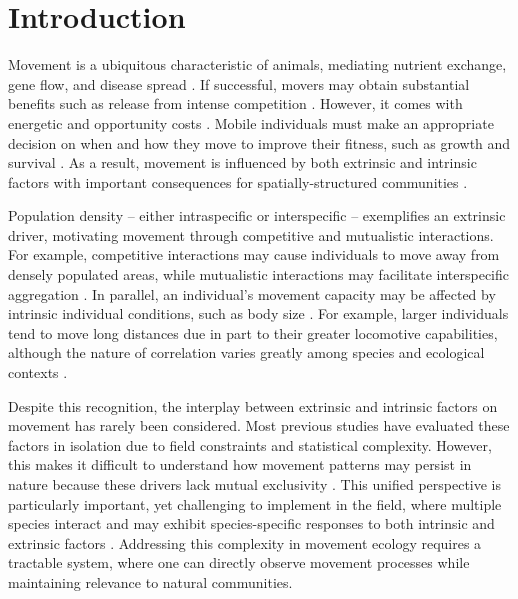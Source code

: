 \documentclass[11pt, class=article, crop=false]{standalone}
\begin{document}
\newpage

\section{Introduction}

Movement is a ubiquitous characteristic of animals, mediating nutrient exchange, gene flow, and disease spread \citep{cookeMovementEcologyFishes2022, hessDiseaseMetapopulationModels1996, teruiParasiteInfectionInduces2017, fauschLandscapesRiverscapesBridging2002}.
If successful, movers may obtain substantial benefits such as release from intense competition \citep{clobertDispersalEcologyEvolution2012}.
However, it comes with energetic and opportunity costs \citep{bonteCostsDispersal2012}.
Mobile individuals must make an appropriate decision on when and how they move to improve their fitness, such as growth and survival \citep{bonteCostsDispersal2012}. As a result, movement is influenced by both extrinsic and intrinsic factors with important consequences for spatially-structured communities \citep{leiboldMetacommunityConceptFramework2004, mcpeekEvolutionPassiveDispersal2024, schlagelMovementmediatedCommunityAssembly2020}. 

Population density – either intraspecific or interspecific – exemplifies an extrinsic driver, motivating movement through competitive and mutualistic interactions. For example, competitive interactions may cause individuals to move away from densely populated areas, while mutualistic interactions may facilitate interspecific aggregation \citep{thierryInterplayAbioticBiotic2024, rasmussenIndividualMovementStream2017}. In parallel, an individual's movement capacity may be affected by intrinsic individual conditions, such as body size \citep{clobertDispersalEcologyEvolution2012}. For example,  larger individuals tend to move long distances due in part to their greater locomotive capabilities, although the nature of correlation varies greatly among species and ecological contexts \citep{comteEvidenceDispersalSyndromes2018, teruiParasiteInfectionInduces2017, radingerPatternsPredictorsFish2014, debeffeConditiondependentNatalDispersal2012,gilliamMovementCorridorsEnhancement2001}.

Despite this recognition, the interplay between extrinsic and intrinsic factors on movement has rarely been considered. Most previous studies have evaluated these factors in isolation due to field constraints and statistical complexity. However, this makes it difficult to understand how movement patterns may persist in nature because these drivers lack mutual exclusivity \citep{mcmahonLinkingHabitatSelection2006}. 
This unified perspective is particularly important, yet challenging to implement in the field, where multiple species interact and may exhibit species-specific responses to both intrinsic and extrinsic factors \citep{teruiNonrandomDispersalSympatric2021}. Addressing this complexity in movement ecology requires a tractable system, where one can directly observe movement processes while maintaining relevance to natural communities.
\end{document}
